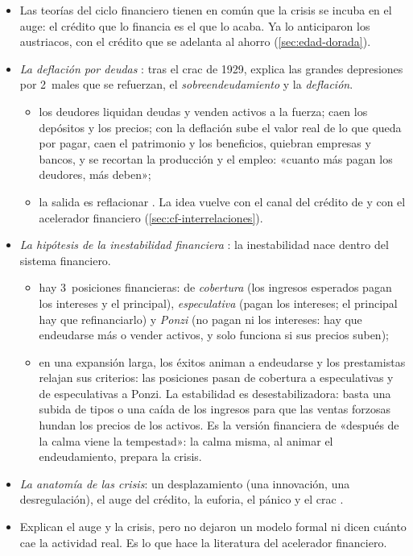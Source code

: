 \documentclass[11pt]{article}
\begin{document}
\begin{itemize}
\item Las teorías del ciclo financiero tienen en común que la crisis se incuba en el auge: el crédito que lo financia es el que lo acaba. Ya lo anticiparon los austriacos, con el crédito que se adelanta al ahorro (\ref{sec:edad-dorada}).
\item \emph{La deflación por deudas}\nocite{Fisher1933} : tras el crac de 1929,  explica las grandes depresiones por 2~males que se refuerzan, el \emph{sobreendeudamiento} y la \emph{deflación}.
  \begin{itemize}
  \item los deudores liquidan deudas y venden activos a la fuerza; caen los depósitos y los precios; con la deflación sube el valor real de lo que queda por pagar, caen el patrimonio y los beneficios, quiebran empresas y bancos, y se recortan la producción y el empleo: «cuanto más pagan los deudores, más deben»\nocite{Fisher1933};
  \item la salida es reflacionar . La idea vuelve con el canal del crédito de \textcite{Bernanke1983Nonmonetary} y con el acelerador financiero (\ref{sec:cf-interrelaciones}).
  \end{itemize}
\item \emph{La hipótesis de la inestabilidad financiera}\nocite{Minsky1986Stabilizing,Minsky1992Financial} : la inestabilidad nace dentro del sistema financiero.
  \begin{itemize}
  \item hay 3~posiciones financieras: de \emph{cobertura} (los ingresos esperados pagan los intereses y el principal), \emph{especulativa} (pagan los intereses; el principal hay que refinanciarlo) y \emph{Ponzi} (no pagan ni los intereses: hay que endeudarse más o vender activos, y solo funciona si sus precios suben);
  \item en una expansión larga, los éxitos animan a endeudarse y los prestamistas relajan sus criterios: las posiciones pasan de cobertura a especulativas y de especulativas a Ponzi. La estabilidad es desestabilizadora: basta una subida de tipos o una caída de los ingresos para que las ventas forzosas hundan los precios de los activos. Es la versión financiera de «después de la calma viene la tempestad»: la calma misma, al animar el endeudamiento, prepara la crisis.
  \end{itemize}
\item \emph{La anatomía de las crisis}\nocite{Kindleberger1978Manias}: un desplazamiento (una innovación, una desregulación), el auge del crédito, la euforia, el pánico y el crac .
\item Explican el auge y la crisis, pero no dejaron un modelo formal ni dicen cuánto cae la actividad real. Es lo que hace la literatura del acelerador financiero.
\end{itemize}
\end{document}
